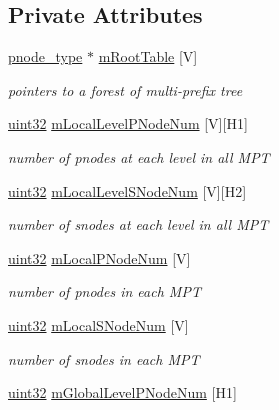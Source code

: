 \subsection*{Private Attributes}
\begin{DoxyCompactItemize}
\item 
\hyperlink{classRMPTree_ac37da419a61106e5996632fc83670959}{pnode\-\_\-type} $\ast$ \hyperlink{classRMPTree_a4241c1689e08498084c51399549ae6b7}{m\-Root\-Table} \mbox{[}V\mbox{]}
\begin{DoxyCompactList}\small\item\em pointers to a forest of multi-\/prefix tree \end{DoxyCompactList}\item 
\hyperlink{types_8h_abd01e8e67e3d94cab04ecaaf4f85ac1b}{uint32} \hyperlink{classRMPTree_a80594c79c981b7599d05b39c8701fbb8}{m\-Local\-Level\-P\-Node\-Num} \mbox{[}V\mbox{]}\mbox{[}H1\mbox{]}
\begin{DoxyCompactList}\small\item\em number of pnodes at each level in all M\-P\-T \end{DoxyCompactList}\item 
\hyperlink{types_8h_abd01e8e67e3d94cab04ecaaf4f85ac1b}{uint32} \hyperlink{classRMPTree_a02dd259c17645662ea922afa6aa5959a}{m\-Local\-Level\-S\-Node\-Num} \mbox{[}V\mbox{]}\mbox{[}H2\mbox{]}
\begin{DoxyCompactList}\small\item\em number of snodes at each level in all M\-P\-T \end{DoxyCompactList}\item 
\hyperlink{types_8h_abd01e8e67e3d94cab04ecaaf4f85ac1b}{uint32} \hyperlink{classRMPTree_a155ea8b9b340e1e108105062cfb2aa75}{m\-Local\-P\-Node\-Num} \mbox{[}V\mbox{]}
\begin{DoxyCompactList}\small\item\em number of pnodes in each M\-P\-T \end{DoxyCompactList}\item 
\hyperlink{types_8h_abd01e8e67e3d94cab04ecaaf4f85ac1b}{uint32} \hyperlink{classRMPTree_a5662a149c9af51f1d0d470ee9b700a61}{m\-Local\-S\-Node\-Num} \mbox{[}V\mbox{]}
\begin{DoxyCompactList}\small\item\em number of snodes in each M\-P\-T \end{DoxyCompactList}\item 
\hyperlink{types_8h_abd01e8e67e3d94cab04ecaaf4f85ac1b}{uint32} \hyperlink{classRMPTree_a5bfe436635f93a065affd03637d6b361}{m\-Global\-Level\-P\-Node\-Num} \mbox{[}H1\mbox{]}

\end{DoxyCompactItemize}
